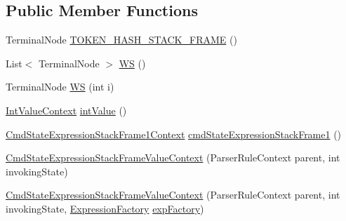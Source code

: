 \subsection*{Public Member Functions}
\begin{DoxyCompactItemize}
\item 
Terminal\+Node \hyperlink{classgov_1_1nasa_1_1jpf_1_1inspector_1_1server_1_1expression_1_1parser_1_1_expression_grammar_pa27eac9bb10e329b6f1427633e5ce16ca_aaf0a841dcad9ff07411cc68529af3f7f}{T\+O\+K\+E\+N\+\_\+\+H\+A\+S\+H\+\_\+\+S\+T\+A\+C\+K\+\_\+\+F\+R\+A\+ME} ()
\item 
List$<$ Terminal\+Node $>$ \hyperlink{classgov_1_1nasa_1_1jpf_1_1inspector_1_1server_1_1expression_1_1parser_1_1_expression_grammar_pa27eac9bb10e329b6f1427633e5ce16ca_ab42c2941989598386d2d1e479443b1b2}{WS} ()
\item 
Terminal\+Node \hyperlink{classgov_1_1nasa_1_1jpf_1_1inspector_1_1server_1_1expression_1_1parser_1_1_expression_grammar_pa27eac9bb10e329b6f1427633e5ce16ca_aab8d6b8424c3c5ab19eb4a7af872c688}{WS} (int i)
\item 
\hyperlink{classgov_1_1nasa_1_1jpf_1_1inspector_1_1server_1_1expression_1_1parser_1_1_expression_grammar_parser_1_1_int_value_context}{Int\+Value\+Context} \hyperlink{classgov_1_1nasa_1_1jpf_1_1inspector_1_1server_1_1expression_1_1parser_1_1_expression_grammar_pa27eac9bb10e329b6f1427633e5ce16ca_ac085fdae27a3a2ba40e268c43d12f6ae}{int\+Value} ()
\item 
\hyperlink{classgov_1_1nasa_1_1jpf_1_1inspector_1_1server_1_1expression_1_1parser_1_1_expression_grammar_pabec1adacda521b9e6ed9ea64caf537b4}{Cmd\+State\+Expression\+Stack\+Frame1\+Context} \hyperlink{classgov_1_1nasa_1_1jpf_1_1inspector_1_1server_1_1expression_1_1parser_1_1_expression_grammar_pa27eac9bb10e329b6f1427633e5ce16ca_aa1273708d8c0751b2717a0e45c075e52}{cmd\+State\+Expression\+Stack\+Frame1} ()
\item 
\hyperlink{classgov_1_1nasa_1_1jpf_1_1inspector_1_1server_1_1expression_1_1parser_1_1_expression_grammar_pa27eac9bb10e329b6f1427633e5ce16ca_a319c64ecf02ac0e5e11549db15d0a527}{Cmd\+State\+Expression\+Stack\+Frame\+Value\+Context} (Parser\+Rule\+Context parent, int invoking\+State)
\item 
\hyperlink{classgov_1_1nasa_1_1jpf_1_1inspector_1_1server_1_1expression_1_1parser_1_1_expression_grammar_pa27eac9bb10e329b6f1427633e5ce16ca_a9f1e20c5d52202c98ab9b7eb781a3086}{Cmd\+State\+Expression\+Stack\+Frame\+Value\+Context} (Parser\+Rule\+Context parent, int invoking\+State, \hyperlink{classgov_1_1nasa_1_1jpf_1_1inspector_1_1server_1_1expression_1_1_expression_factory}{Expression\+Factory} \hyperlink{classgov_1_1nasa_1_1jpf_1_1inspector_1_1server_1_1expression_1_1parser_1_1_expression_grammar_pa27eac9bb10e329b6f1427633e5ce16ca_a7d60addcf1516b83eafb0df7ecdbeabe}{exp\+Factory})

\end{DoxyCompactItemize}
